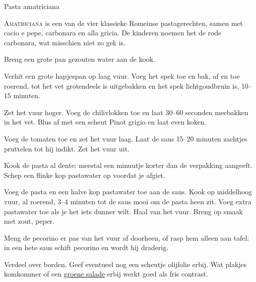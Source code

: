 \begin{recipe}{Pasta amatriciana}


\lettrine{A}{matriciana} is een van de vier klassieke Romeinse pastagerechten,
samen met cacio e pepe, carbonara en alla gricia. De kinderen noemen het de rode carbonara, wat misschien niet zo gek is.

\begin{ingredients}
\end{ingredients}

\begin{steps}
  \item Breng een grote pan gezouten water aan de kook. 
  \item Verhit een grote hapjespan op laag vuur. Voeg het spek toe en bak,
        af en toe roerend, tot het vet grotendeels is uitgebakken en het spek
        lichtgoudbruin is, 10--15 minuten.
  \item Zet het vuur hoger. Voeg de chilivlokken toe en laat 30--60 seconden
        meebakken in het vet. Blus af met een scheut Pinot grigio en laat even
        koken.
  \item Voeg de tomaten toe en zet het vuur laag. Laat de saus 15--20 minuten
        zachtjes pruttelen tot hij indikt. Zet het vuur uit.
  \item Kook de pasta al dente: meestal een minuutje korter dan de verpakking
        aangeeft. Schep een flinke kop pastawater op voordat je afgiet.
  \item Voeg de pasta en een halve kop pastawater toe aan de saus. Kook op
        middelhoog vuur, al roerend, 3--4 minuten tot de saus mooi om de pasta
        heen zit. Voeg extra pastawater toe als je het iets dunner wilt.
        Haal van het vuur. Breng op smaak met zout, peper.
  \item Meng de pecorino er pas van het vuur af doorheen, of rasp hem alleen
        aan tafel: in een hete saus schift pecorino en wordt hij draderig.
  \item Verdeel over borden. Geef eventueel nog een scheutje olijfolie erbij.
        Wat plakjes komkommer of een \hyperref[recipe:groene-salade]{groene salade}
        erbij werkt goed als fris contrast.
\end{steps}
\end{recipe}
